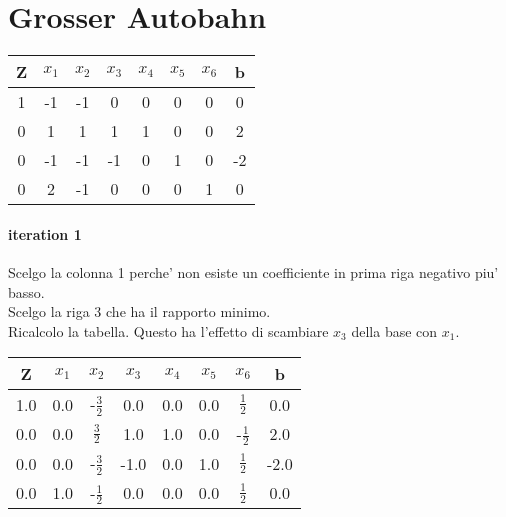 \section{Grosser Autobahn}
\begin{center}
	\begin{tabular}{|c|c|c|c|c|c|c|c|}
		\hline
		Z & $x_1$ & $x_2$ & $x_3$ & $x_4$ & $x_5$ & $x_6$ & b\\
		\hline
		1 & -1 & -1 & 0 & 0 & 0 & 0 & 0\\
		0 & 1 & 1 & 1 & 1 & 0 & 0 & 2\\
		0 & -1 & -1 & -1 & 0 & 1 & 0 & -2\\
		0 & 2 & -1 & 0 & 0 & 0 & 1 & 0\\
		\hline
	\end{tabular}
\end{center}
\paragraph{iteration 1}
Scelgo la colonna 1 perche' non esiste un coefficiente in prima riga negativo piu' basso. \\
Scelgo la riga 3 che ha il rapporto minimo. \\
Ricalcolo la tabella.
Questo ha l'effetto di scambiare $x_3$ della base con $x_1$. \
\begin{center}
	\begin{tabular}{|c|c|c|c|c|c|c|c|}
		\hline
		Z & $x_1$ & $x_2$ & $x_3$ & $x_4$ & $x_5$ & $x_6$ & b\\
		\hline
		1.0 & 0.0 & -$\frac 3 2$ & 0.0 & 0.0 & 0.0 & $\frac 1 2$ & 0.0\\
		0.0 & 0.0 & $\frac 3 2$ & 1.0 & 1.0 & 0.0 & -$\frac 1 2$ & 2.0\\
		0.0 & 0.0 & -$\frac 3 2$ & -1.0 & 0.0 & 1.0 & $\frac 1 2$ & -2.0\\
		0.0 & 1.0 & -$\frac 1 2$ & 0.0 & 0.0 & 0.0 & $\frac 1 2$ & 0.0\\
		\hline
	\end{tabular}
\end{center}
